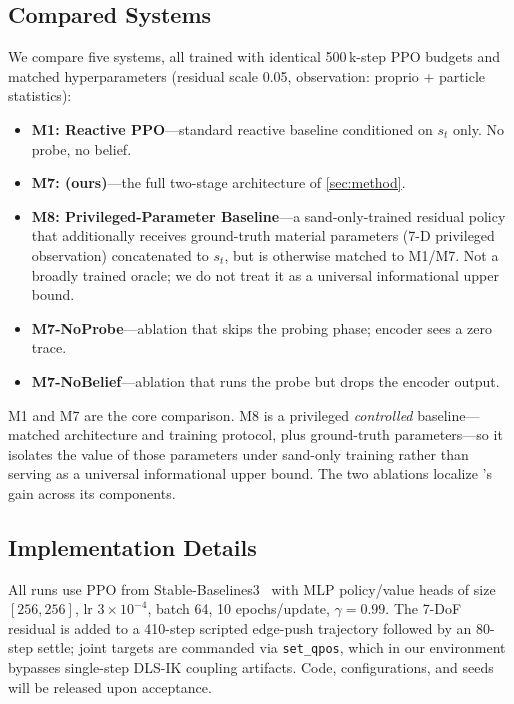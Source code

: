 \subsection{Compared Systems}

We compare five systems, all trained with identical 500\,k-step PPO budgets and matched hyperparameters (residual scale 0.05, observation: proprio + particle statistics):

\begin{itemize}
    \item \textbf{M1: Reactive PPO}---standard reactive baseline conditioned on $s_t$ only. No probe, no belief.
    \item \textbf{M7: \PTA{} (ours)}---the full two-stage architecture of \cref{sec:method}.
    \item \textbf{M8: Privileged-Parameter Baseline}---a sand-only-trained residual policy that additionally receives ground-truth material parameters (7-D privileged observation) concatenated to $s_t$, but is otherwise matched to M1/M7. Not a broadly trained oracle; we do not treat it as a universal informational upper bound.
    \item \textbf{M7-NoProbe}---ablation that skips the probing phase; encoder sees a zero trace.
    \item \textbf{M7-NoBelief}---ablation that runs the probe but drops the encoder output.
\end{itemize}

M1 and M7 are the core comparison. M8 is a privileged \emph{controlled} baseline---matched architecture and training protocol, plus ground-truth parameters---so it isolates the value of those parameters under sand-only training rather than serving as a universal informational upper bound. The two ablations localize \PTA{}'s gain across its components.

\subsection{Implementation Details}

All runs use PPO from Stable-Baselines3~\cite{raffin2021stable} with MLP policy/value heads of size $[256,256]$, lr $3\times10^{-4}$, batch 64, 10 epochs/update, $\gamma=0.99$. The 7-DoF residual is added to a 410-step scripted edge-push trajectory followed by an 80-step settle; joint targets are commanded via \texttt{set\_qpos}, which in our environment bypasses single-step DLS-IK coupling artifacts. Code, configurations, and seeds will be released upon acceptance.
